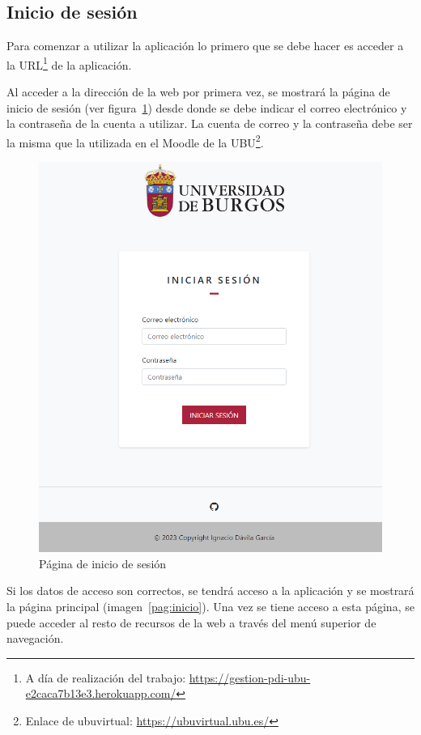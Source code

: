 \subsection{Inicio de sesión}

Para comenzar a utilizar la aplicación lo primero que se debe hacer es acceder a la URL\footnote{A día de realización del trabajo: \url{https://gestion-pdi-ubu-e2caca7b13e3.herokuapp.com/}} de la aplicación.

Al acceder a la dirección de la web por primera vez, se mostrará la página de inicio de sesión (ver figura~\ref{pag:login}) desde donde se debe indicar el correo electrónico y la contraseña de la cuenta a utilizar.
La cuenta de correo y la contraseña debe ser la misma que la utilizada en el Moodle de la UBU\footnote{Enlace de ubuvirtual: \url{https://ubuvirtual.ubu.es/}}.

\begin{figure}
	\centering
	\includegraphics[width=\textwidth]{../img/Anexos/Manual usuario/login.png}
	\caption{Página de inicio de sesión}\label{pag:login}
\end{figure}

Si los datos de acceso son correctos, se tendrá acceso a la aplicación y se mostrará la página principal (imagen~\ref{pag:inicio}).
Una vez se tiene acceso a esta página, se puede acceder al resto de recursos de la web a través del menú superior de navegación.

